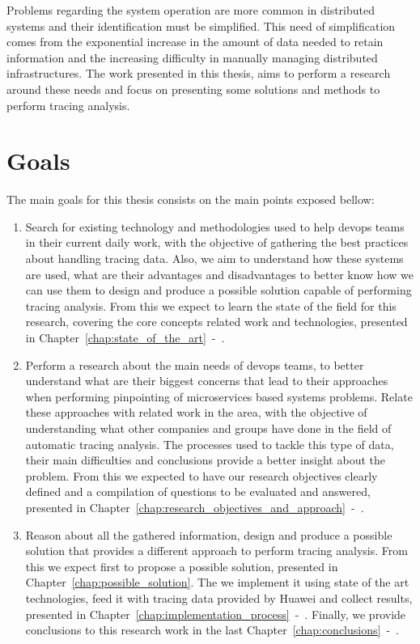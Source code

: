 Problems regarding the system operation are more common in distributed systems and their identification must be simplified. This need of simplification comes from the exponential increase in the amount of data needed to retain information and the increasing difficulty in manually managing distributed infrastructures. The work presented in this thesis, aims to perform a research around these needs and focus on presenting some solutions and methods to perform tracing analysis.

\section{Goals}
\label{sec:goals}

The main goals for this thesis consists on the main points exposed bellow:

\begin{enumerate}
    \item Search for existing technology and methodologies used to help \gls{devops} teams in their current daily work, with the objective of gathering the best practices about handling tracing data. Also, we aim to understand how these systems are used, what are their advantages and disadvantages to better know how we can use them to design and produce a possible solution capable of performing tracing analysis. From this we expect to learn the state of the field for this research, covering the core concepts related work and technologies, presented in Chapter~\ref{chap:state_of_the_art}~-~.
    \item Perform a research about the main needs of \gls{devops} teams, to better understand what are their biggest concerns that lead to their approaches when performing pinpointing of microservices based systems problems. Relate these approaches with related work in the area, with the objective of understanding what other companies and groups have done in the field of automatic tracing analysis. The processes used to tackle this type of data, their main difficulties and conclusions provide a better insight about the problem. From this we expected to have our research objectives clearly defined and a compilation of questions to be evaluated and answered, presented in Chapter~\ref{chap:research_objectives_and_approach}~-~.
    \item Reason about all the gathered information, design and produce a possible solution that provides a different approach to perform tracing analysis. From this we expect first to propose a possible solution, presented in Chapter~\ref{chap:possible_solution}. The we implement it using state of the art technologies, feed it with tracing data provided by Huawei and collect results, presented in Chapter~\ref{chap:implementation_process}~-~. Finally, we provide conclusions to this research work in the last Chapter~\ref{chap:conclusions}~-~.
\end{enumerate}

